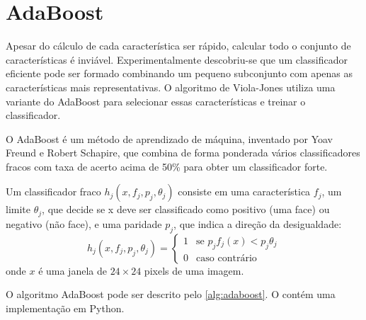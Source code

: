 \section{AdaBoost}\label{sec:adaboost}

Apesar do cálculo de cada característica ser rápido, calcular todo o conjunto de características é inviável. Experimentalmente descobriu-se que um classificador eficiente pode ser formado combinando um pequeno subconjunto com apenas as características mais representativas. O algoritmo de Viola-Jones utiliza uma variante do AdaBoost para selecionar essas características e treinar o classificador.

O AdaBoost é um método de aprendizado de máquina, inventado por Yoav Freund e Robert Schapire\cite{freund1997decision}, que combina de forma ponderada vários classificadores fracos com taxa de acerto acima de 50\% para obter um classificador forte.

Um classificador fraco $h_{j}(x,f_{j},p_{j},\theta_{j})$ consiste em uma característica $f_{j}$, um limite $\theta_{j}$, que decide se x deve ser classificado como positivo (uma face) ou negativo (não face), e uma paridade $p_{j}$, que indica a direção da desigualdade:
%
\begin{equation} \label{eq:weak_classifier}
    h_{j}(x,f_{j},p_{j},\theta_{j}) = 
    \begin{cases}
        1 & \text{se } p_{j}f_{j}(x) < p_{j}\theta_{j}\\
        0 & \text{caso contrário}
    \end{cases}
\end{equation}
%
onde $x$ é uma janela de $24\times24$ pixels de uma imagem.

O algoritmo AdaBoost pode ser descrito pelo \autoref{alg:adaboost}. O  contém uma implementação em Python.

